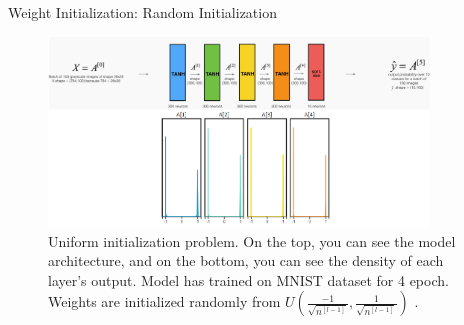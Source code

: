 %	

\begin{frame}{Weight Initialization: Random Initialization}
	\begin{figure}[H]
		\centering
		\includegraphics[width=0.9\textwidth]{Images/normal-init.png}
		\caption{Uniform initialization problem. On the top, you can see the model architecture, and on the bottom, you can see the density of each layer's output. Model has trained on MNIST dataset for 4 epoch. Weights are initialized randomly from $U(\frac{-1}{\sqrt{n^{[l-1]}}}, \frac{1}{\sqrt{n^{[l-1]}}})$ \cite{katanforoosh-kunin}.}
	\end{figure}
\end{frame}

